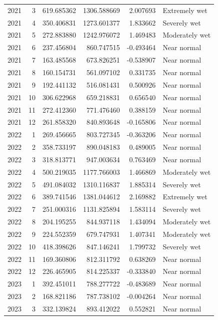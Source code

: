 \begin{tabular}{rrrrrl}
2021 & 3 & 619.685362 & 1306.588669 & 2.007693 & Extremely wet \\
2021 & 4 & 350.406831 & 1273.601377 & 1.833662 & Severely wet \\
2021 & 5 & 272.883880 & 1242.976072 & 1.469483 & Moderately wet \\
2021 & 6 & 237.456804 & 860.747515 & -0.493464 & Near normal \\
2021 & 7 & 163.485568 & 673.826251 & -0.538907 & Near normal \\
2021 & 8 & 160.154731 & 561.097102 & 0.331735 & Near normal \\
2021 & 9 & 192.441132 & 516.081431 & 0.500926 & Near normal \\
2021 & 10 & 306.622968 & 659.218831 & 0.656540 & Near normal \\
2021 & 11 & 272.412360 & 771.476460 & 0.388159 & Near normal \\
2021 & 12 & 261.858320 & 840.893648 & -0.165806 & Near normal \\
2022 & 1 & 269.456665 & 803.727345 & -0.363206 & Near normal \\
2022 & 2 & 358.733197 & 890.048183 & 0.489005 & Near normal \\
2022 & 3 & 318.813771 & 947.003634 & 0.763469 & Near normal \\
2022 & 4 & 500.219035 & 1177.766003 & 1.466869 & Moderately wet \\
2022 & 5 & 491.084032 & 1310.116837 & 1.885314 & Severely wet \\
2022 & 6 & 389.741546 & 1381.044612 & 2.169882 & Extremely wet \\
2022 & 7 & 251.000316 & 1131.825894 & 1.583114 & Severely wet \\
2022 & 8 & 204.195255 & 844.937118 & 1.434094 & Moderately wet \\
2022 & 9 & 224.552359 & 679.747931 & 1.407341 & Moderately wet \\
2022 & 10 & 418.398626 & 847.146241 & 1.799732 & Severely wet \\
2022 & 11 & 169.360806 & 812.311792 & 0.638269 & Near normal \\
2022 & 12 & 226.465905 & 814.225337 & -0.333840 & Near normal \\
2023 & 1 & 392.451011 & 788.277722 & -0.483689 & Near normal \\
2023 & 2 & 168.821186 & 787.738102 & -0.004264 & Near normal \\
2023 & 3 & 332.139824 & 893.412022 & 0.552821 & Near normal \\

\end{tabular}
